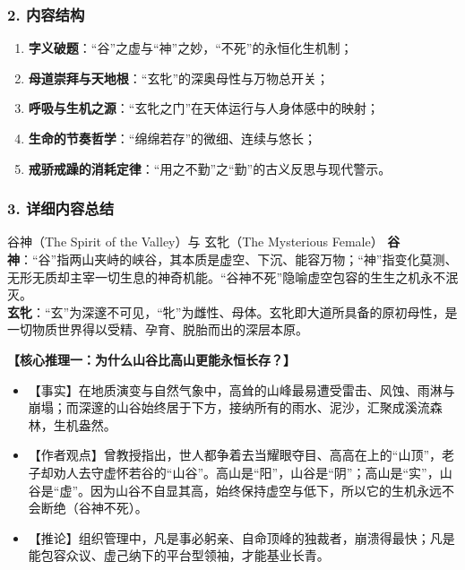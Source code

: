 \subsubsection{2. 内容结构}
\begin{enumerate}
    \item \textbf{字义破题}：“谷”之虚与“神”之妙，“不死”的永恒化生机制；
    \item \textbf{母道崇拜与天地根}：“玄牝”的深奥母性与万物总开关；
    \item \textbf{呼吸与生机之源}：“玄牝之门”在天体运行与人身体感中的映射；
    \item \textbf{生命的节奏哲学}：“绵绵若存”的微细、连续与悠长；
    \item \textbf{戒骄戒躁的消耗定律}：“用之不勤”之“勤”的古义反思与现代警示。
\end{enumerate}

\subsubsection{3. 详细内容总结}

\begin{ConceptBox}{谷神（The Spirit of the Valley）与 玄牝（The Mysterious Female）}
\textbf{谷神}：“谷”指两山夹峙的峡谷，其本质是虚空、下沉、能容万物；“神”指变化莫测、无形无质却主宰一切生息的神奇机能。“谷神不死”隐喻虚空包容的生生之机永不泯灭。\\
\textbf{玄牝}：“玄”为深邃不可见，“牝”为雌性、母体。玄牝即大道所具备的原初母性，是一切物质世界得以受精、孕育、脱胎而出的深层本原。
\end{ConceptBox}

\noindent\textbf{【核心推理一：为什么山谷比高山更能永恒长存？】}
\begin{itemize}
    \item 【事实】在地质演变与自然气象中，高耸的山峰最易遭受雷击、风蚀、雨淋与崩塌；而深邃的山谷始终居于下方，接纳所有的雨水、泥沙，汇聚成溪流森林，生机盎然。
    \item 【作者观点】曾教授指出，世人都争着去当耀眼夺目、高高在上的“山顶”，老子却劝人去守虚怀若谷的“山谷”。高山是“阳”，山谷是“阴”；高山是“实”，山谷是“虚”。因为山谷不自显其高，始终保持虚空与低下，所以它的生机永远不会断绝（谷神不死）。
    \item 【推论】组织管理中，凡是事必躬亲、自命顶峰的独裁者，崩溃得最快；凡是能包容众议、虚己纳下的平台型领袖，才能基业长青。
\end{itemize}


